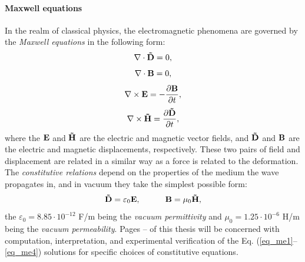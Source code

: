 \paragraph{Maxwell equations} In the realm of classical physics, the electromagnetic phenomena are governed by the \textit{Maxwell equations} in the following form: %
\begin{equation} \nabla \cdot  \mathbf{\tilde{D}} = 0, \label{eq_me1}\end{equation}  
\begin{equation} \nabla \cdot  \mathbf{B} = 0, \label{eq_me2}\end{equation}  
\begin{equation} \nabla \times \mathbf{E} = -\frac{\partial \mathbf{B}} {\partial t}, \label{eq_me3}\end{equation}  
\begin{equation} \nabla \times \mathbf{\tilde{H}} =  \frac{\partial \mathbf{\tilde{D}}} {\partial t}, \label{eq_me4}\end{equation}  
where the $\mathbf{E}$ and $\mathbf{\tilde{H}}$ are the electric and magnetic vector fields, and $\mathbf{\tilde{D}}$ and $\mathbf{B}$ are the electric and magnetic displacements,
 respectively. These two pairs of field and displacement are related in a similar way as a force is related to the deformation. The \textit{constitutive relations} depend on the properties of the medium the wave propagates in, and in vacuum they take the simplest possible form:
\begin{equation}		\mathbf{\tilde{D}} = \varepsilon_0	\mathbf{E}, \quad\quad\quad						\mathbf{B} = \mu_0			\mathbf{\tilde{H}},				 \label{eq_ce}\end{equation}
the $\varepsilon_0 = 8.85\cdot10^{-12}$ F/m being the \textit{vacuum permittivity} and $\mu_0 = 1.25\cdot10^{-6}$ H/m being the \textit{vacuum permeability}. 
Pages \pageref{starttext}--\pageref{endtext} of this thesis will be concerned with computation, interpretation, and experimental verification of the Eq. (\ref{eq_me1}--\ref{eq_me4}) solutions for specific choices of constitutive equations.
\label{starttext}
